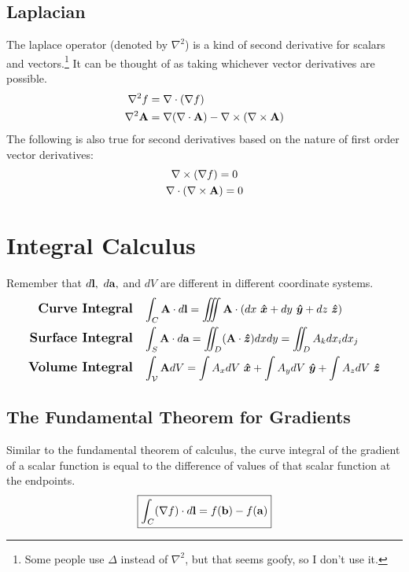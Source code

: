     \subsection*{Laplacian}
        The laplace operator (denoted by \(\nabla^2\)) is a kind of second derivative for scalars and vectors.\footnote{Some people use \(\Delta\) instead of \(\nabla^2\), but that seems goofy, so I don't use it.} It can be thought of as taking whichever vector derivatives are possible. 
        \begin{align}
            \nabla^2f
            &=\nabla \cdot (\nabla f)
            \\
            \nabla^2 \vb{A} 
            &= \nabla(\nabla \cdot \vb{A}) - \nabla\times (\nabla \times \vb{A}) 
        \end{align}
        The following is also true for second derivatives based on the nature of first order vector derivatives:
        \begin{gather}
            \nabla\times (\nabla f)
            = 0
            \\
            \nabla \cdot (\nabla \times \vb{A}) 
            = 0 
        \end{gather}
\newpage
\section{Integral Calculus}      
    Remember that \(\dl*,~\da*,\) and $dV$ are different in different coordinate systems.
    \length[0.5 cm]
    \begin{align}
        \textbf{ \large Curve Integral}&
        \quad\int_C \vb{A}\dl=\iiint\vb{A}\cdot\qty(dx\ \e{x}+dy\ \e{y}+dz\ \e{z})
        \\
        \textbf{\large Surface Integral}&\quad
        \int_S \vb{A}\da=\iint_D(\vb{A}\cdot\e{z})dxdy=\iint_D A_k dx_idx_j
        \\
        \textbf{\large Volume Integral}&\quad
        \int_{\mathcal{V}} \vb{A} dV=\int A_xdV\ \e{x}+\int A_ydV\ \e{y}+\int A_z dV\ \e{z}
    \end{align}
    \length

    \subsection*{The Fundamental Theorem for Gradients}
        Similar to the fundamental theorem of calculus, the curve integral of the gradient of a scalar function is equal to the difference of values of that scalar function at the endpoints. 
        \begin{equation}
            \boxed{\int_C(\nabla f)\dl=f(\mathbf{b})-f(\mathbf{a})}
        \end{equation}
